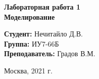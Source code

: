 \documentclass[a4paper, 14pt]{extreport}
\begin{document}
 	\vspace*{20mm}
 	
 	\LARGE
 	\begin{center}
 		\textbf{Лабораторная работа 1} \\
 		\textbf{Моделирование}
 	\end{center}
 	
 	\vspace*{30mm}
 	
 	\large
 	\begin{flushleft}
 		\textbf{Студент:} Нечитайло Д.В. \\
 		\textbf{Группа:} ИУ7-66Б \\
 		\textbf{Преподаватель:} Градов В.М. \\
 	\end{flushleft}
 	
 	\vspace*{30mm}
 	
 	\large
 	\begin{center}
 		Москва, 2021 г.
 	\end{center}
 	
 	\thispagestyle{empty}
 	
 	\newpage
 	
 	
    
    
    
\end{document}
